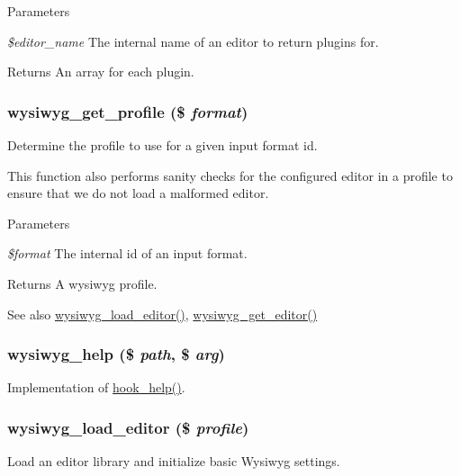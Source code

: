 \begin{DoxyParams}{Parameters}
\item[{\em \$editor\_\-name}]The internal name of an editor to return plugins for.\end{DoxyParams}
\begin{DoxyReturn}{Returns}
An array for each plugin. 
\end{DoxyReturn}
\hypertarget{wysiwyg_8module_aa06388aeffb7f00e3b20466dc40f71b5}{
\subsubsection[{wysiwyg\_\-get\_\-profile}]{\setlength{\rightskip}{0pt plus 5cm}wysiwyg\_\-get\_\-profile (\$ {\em format})}}
\label{wysiwyg_8module_aa06388aeffb7f00e3b20466dc40f71b5}
Determine the profile to use for a given input format id.

This function also performs sanity checks for the configured editor in a profile to ensure that we do not load a malformed editor.


\begin{DoxyParams}{Parameters}
\item[{\em \$format}]The internal id of an input format.\end{DoxyParams}
\begin{DoxyReturn}{Returns}
A wysiwyg profile.
\end{DoxyReturn}
\begin{DoxySeeAlso}{See also}
\hyperlink{wysiwyg_8module_ae494992d10299bda104526267b2cbef0}{wysiwyg\_\-load\_\-editor()}, \hyperlink{group__wysiwyg__api_gaf5c3c86f49f33be930fa6f9b5405a2a6}{wysiwyg\_\-get\_\-editor()} 
\end{DoxySeeAlso}
\hypertarget{wysiwyg_8module_a4926cb9285c08293cd92c520a8161248}{
\subsubsection[{wysiwyg\_\-help}]{\setlength{\rightskip}{0pt plus 5cm}wysiwyg\_\-help (\$ {\em path}, \/  \$ {\em arg})}}
\label{wysiwyg_8module_a4926cb9285c08293cd92c520a8161248}
Implementation of \hyperlink{group__hooks_ga5589c2714a782738e8851c4c90231f0e}{hook\_\-help()}. \hypertarget{wysiwyg_8module_ae494992d10299bda104526267b2cbef0}{
\subsubsection[{wysiwyg\_\-load\_\-editor}]{\setlength{\rightskip}{0pt plus 5cm}wysiwyg\_\-load\_\-editor (\$ {\em profile})}}
\label{wysiwyg_8module_ae494992d10299bda104526267b2cbef0}
Load an editor library and initialize basic Wysiwyg settings.


